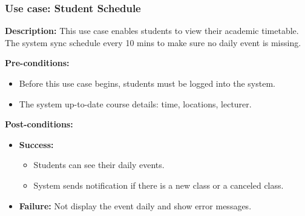 \documentclass{article}
\begin{document}
    

\subsubsection{Use case: Student Schedule}
    \textbf{Description:} This use case enables students to view their academic timetable. The system sync schedule every 10 mins to make sure no daily event is missing.

    \noindent \textbf{Pre-conditions:} 
        \begin{itemize}
            \item Before this use case begins, students must be logged into the system.
            \item The system up-to-date course details: time, locations, lecturer.
        \end{itemize}
    \noindent \textbf{Post-conditions:}
    \begin{itemize}
        \item \textbf{Success:} 
        \begin{itemize}
            \item Students can see their daily events.
            \item System sends notification if there is a new class or a canceled class.
        \end{itemize}
        \item \textbf{Failure:} Not display the event daily and show error messages.
    \end{itemize}
\end{document}
